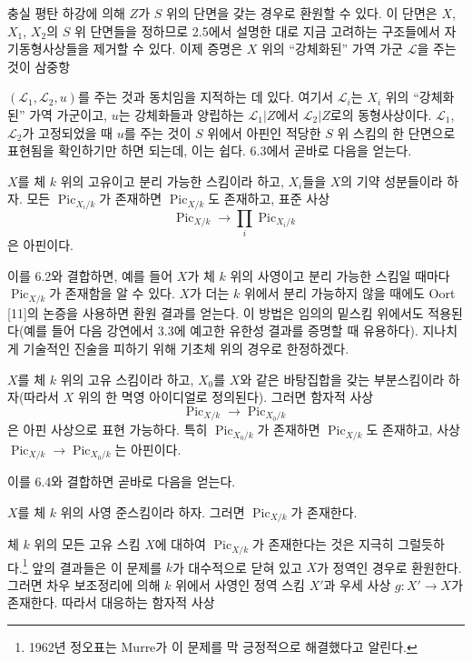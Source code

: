 충실 평탄 하강에 의해 $Z$가 $S$ 위의 단면을 갖는 경우로 환원할 수 있다.
이 단면은 $X$, $X_1$, $X_2$의 $S$ 위 단면들을 정하므로 2.5에서 설명한
대로 지금 고려하는 구조들에서 자기동형사상들을 제거할 수 있다. 이제 증명은
$X$ 위의 ``강체화된'' 가역 가군 $\mathcal L$을 주는 것이 삼중항

$(\mathcal L_1,\mathcal L_2,u)$를 주는 것과 동치임을 지적하는 데 있다.
여기서 $\mathcal L_i$는 $X_i$ 위의 ``강체화된'' 가역 가군이고, $u$는
강체화들과 양립하는 $\mathcal L_1|Z$에서 $\mathcal L_2|Z$로의
동형사상이다. $\mathcal L_1$, $\mathcal L_2$가 고정되었을 때 $u$를 주는
것이 $S$ 위에서 아핀인 적당한 $S$ 위 스킴의 한 단면으로 표현됨을 확인하기만
하면 되는데, 이는 쉽다. 6.3에서 곧바로 다음을 얻는다.

 $X$를 체 $k$ 위의 고유이고 분리 가능한 스킴이라
하고, $X_i$들을 $X$의 기약 성분들이라 하자. 모든
$\operatorname{Pic}_{X_i/k}$가 존재하면 $\operatorname{Pic}_{X/k}$도
존재하고, 표준 사상
\[
\operatorname{Pic}_{X/k}\longrightarrow\prod_i\operatorname{Pic}_{X_i/k}
\]
은 아핀이다.

이를 6.2와 결합하면, 예를 들어 $X$가 체 $k$ 위의 사영이고 분리 가능한
스킴일 때마다 $\operatorname{Pic}_{X/k}$가 존재함을 알 수 있다. $X$가 더는
$k$ 위에서 분리 가능하지 않을 때에도 Oort [11]의 논증을 사용하면 환원
결과를 얻는다. 이 방법은 임의의 밑스킴 위에서도 적용된다(예를 들어 다음
강연에서 3.3에 예고한 유한성 결과를 증명할 때 유용하다). 지나치게 기술적인
진술을 피하기 위해 기초체 위의 경우로 한정하겠다.

 $X$를 체 $k$ 위의 고유 스킴이라 하고, $X_0$를 $X$와
같은 바탕집합을 갖는 부분스킴이라 하자(따라서 $X$ 위의 한 멱영 아이디얼로
정의된다). 그러면 함자적 사상
\[
\operatorname{Pic}_{X/k}\longrightarrow\operatorname{Pic}_{X_0/k}
\]
은 아핀 사상으로 표현 가능하다. 특히 $\operatorname{Pic}_{X_0/k}$가
존재하면 $\operatorname{Pic}_{X/k}$도 존재하고, 사상
$\operatorname{Pic}_{X/k}\longrightarrow\operatorname{Pic}_{X_0/k}$는
아핀이다.

이를 6.4와 결합하면 곧바로 다음을 얻는다.

 $X$를 체 $k$ 위의 사영 준스킴이라 하자. 그러면
$\operatorname{Pic}_{X/k}$가 존재한다.

 체 $k$ 위의 모든 고유 스킴 $X$에 대하여
$\operatorname{Pic}_{X/k}$가 존재한다는 것은 지극히 그럴듯하다.\footnote{
1962년 정오표는 Murre가 이 문제를 막 긍정적으로 해결했다고 알린다.} 앞의
결과들은 이 문제를 $k$가 대수적으로 닫혀 있고 $X$가 정역인 경우로
환원한다. 그러면 차우 보조정리에 의해 $k$ 위에서 사영인 정역 스킴 $X'$과
우세 사상 $g:X'\longrightarrow X$가 존재한다. 따라서 대응하는 함자적 사상

